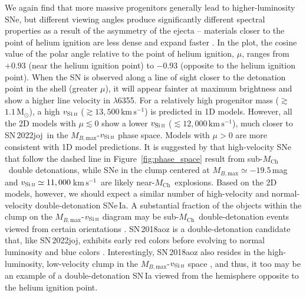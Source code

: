 \documentclass[twocolumn]{aastex631}
\newcommand{\sn}{SN\,2022joj}
\newcommand{\Mch}{$M_\mathrm{Ch}$}
\newcommand{\kms}{$\mathrm{km}\,\mathrm{s}^{-1}$}
\begin{document}
\begin{CJK*}{UTF8}{gbsn}
We again find that more massive progenitors generally lead to higher-luminosity SNe, but different viewing angles produce significantly different spectral properties as a result of the asymmetry of the ejecta -- materials closer to the point of helium ignition are less dense and expand faster \citep{Shen_2D_2021}. In the plot, the cosine value of the polar angle relative to the point of helium ignition, $\mu$, ranges from $+0.93$ (near the helium ignition point) to $-0.93$ (opposite to the helium ignition point). When the SN is observed along a line of sight closer to the detonation point in the shell (greater $\mu$), it will appear fainter at maximum brightness and show a higher line velocity in  $\lambda$6355. For a relatively high progenitor mass ($\gtrsim$$1.1\,\mathrm{M_\odot}$), a high $v_\mathrm{Si\,\textsc{ii}}$ ($\gtrsim$$13,500$\,\kms) is predicted in 1D models. However, all the 2D models with $\mu\lesssim0$ show a lower $v_\mathrm{Si\,\textsc{ii}}$ ($\lesssim$$12,000$\,\kms), much closer to \sn\ in the $M_{B,\mathrm{max}}$-$v_\mathrm{Si\,\textsc{ii}}$ phase space. Models with $\mu>0$ are more consistent with 1D model predictions. It is suggested by \citet{polin_observational_2019} that high-velocity SNe that follow the dashed line in Figure~\ref{fig:phase_space} result from sub-\Mch\ double detonations, while SNe in the clump centered at $M_{B,\mathrm{max}}\simeq-19.5$\,mag and $v_\mathrm{Si\,\textsc{ii}}\simeq11,000$\,\kms\ are likely near-\Mch\ explosions. Based on the 2D models, however, we should expect a similar number of high-velocity and normal-velocity double-detonation SNe\,Ia. A substantial fraction of the objects within the clump on the $M_{B,\mathrm{max}}$-$v_\mathrm{Si\,\textsc{ii}}$ diagram may be sub-\Mch\ double-detonation events viewed from certain orientations \citep{Shen_2D_2021}. SN\,2018aoz is a double-detonation candidate that, like \sn, exhibits early red colors before evolving to normal luminosity and blue colors \citep{Ni_2022}. Interestingly, SN\,2018aoz also resides in the high-luminosity, low-velocity clump in the $M_{B,\mathrm{max}}$-$v_\mathrm{Si\,\textsc{ii}}$ space \citep{Ni_18aoz_2023}, and thus, it too may be an example of a double-detonation SN\,Ia viewed from the hemisphere opposite to the helium ignition point.


\end{CJK*}
\end{document}
